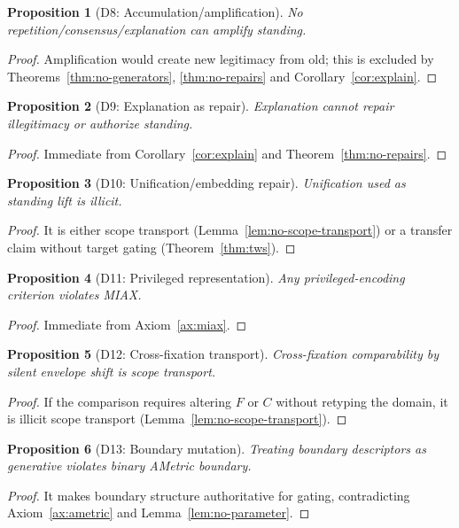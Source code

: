 \documentclass[12pt]{article}
\newtheorem{proposition}{Proposition}
\begin{document}
\begin{proposition}[D8: Accumulation/amplification]
No repetition/consensus/explanation can amplify standing.
\end{proposition}
\begin{proof}
Amplification would create new legitimacy from old; this is excluded by Theorems~\ref{thm:no-generators}, \ref{thm:no-repairs} and Corollary~\ref{cor:explain}. \end{proof}

\begin{proposition}[D9: Explanation as repair]
Explanation cannot repair illegitimacy or authorize standing.
\end{proposition}
\begin{proof}
Immediate from Corollary~\ref{cor:explain} and Theorem~\ref{thm:no-repairs}. \end{proof}

\begin{proposition}[D10: Unification/embedding repair]
Unification used as standing lift is illicit.
\end{proposition}
\begin{proof}
It is either scope transport (Lemma~\ref{lem:no-scope-transport}) or a transfer claim without target gating (Theorem~\ref{thm:tws}). \end{proof}

\begin{proposition}[D11: Privileged representation]
Any privileged-encoding criterion violates MIAX.
\end{proposition}
\begin{proof}
Immediate from Axiom~\ref{ax:miax}. \end{proof}

\begin{proposition}[D12: Cross-fixation transport]
Cross-fixation comparability by silent envelope shift is scope transport.
\end{proposition}
\begin{proof}
If the comparison requires altering $F$ or $C$ without retyping the domain, it is illicit scope transport (Lemma~\ref{lem:no-scope-transport}). \end{proof}

\begin{proposition}[D13: Boundary mutation]
Treating boundary descriptors as generative violates binary AMetric boundary.
\end{proposition}
\begin{proof}
It makes boundary structure authoritative for gating, contradicting Axiom~\ref{ax:ametric} and Lemma~\ref{lem:no-parameter}. \end{proof}
\end{document}
